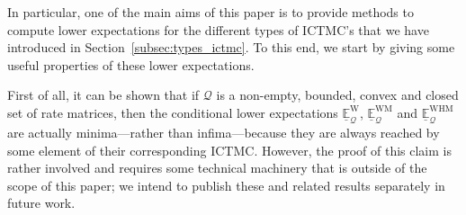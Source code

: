 \documentclass[10pt,a4paper]{paper}
\theoremstyle{definition}
\newcommand{\rateset}{\mathcal{Q}}
\newcommand{\ictmc}{{ICTMC}}
\begin{document}






In particular, one of the main aims of this paper is to provide methods to compute lower expectations for the different types of \ictmc's that we have introduced in Section~\ref{subsec:types_ictmc}. To this end, we start by giving some useful properties of these lower expectations.

First of all, it can be shown that if $\rateset$ is a non-empty, bounded, convex and closed set of rate matrices, then the conditional lower expectations $\underline{\mathbb{E}}_{\rateset}^\mathrm{W}$, $\underline{\mathbb{E}}_{\rateset}^\mathrm{WM}$ and $\underline{\mathbb{E}}_{\rateset}^\mathrm{WHM}$ are actually minima---rather than infima---because they are always reached by some element of their corresponding \ictmc. However, the proof of this claim is rather involved and requires some technical machinery that is outside of the scope of this paper; we intend to publish these and related results separately in future work.
\end{document}
